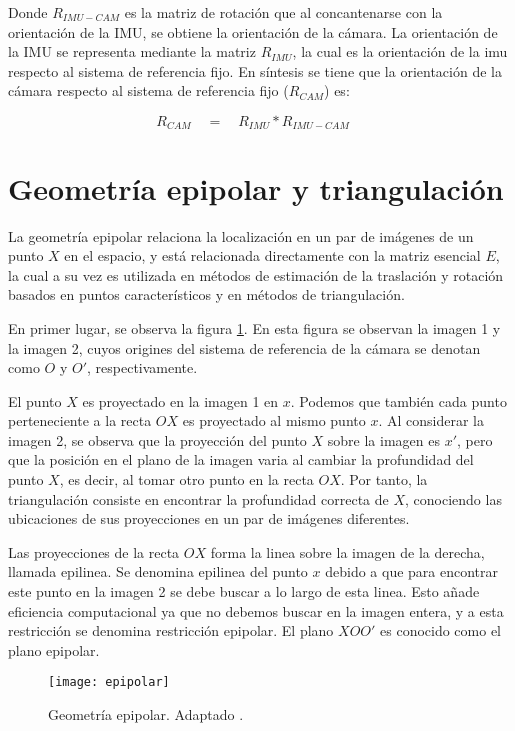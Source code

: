 Donde ${R}_{IMU-CAM}$ es la matriz de rotación que al concantenarse con la orientación de la IMU, se obtiene la orientación de la cámara. La orientación de la IMU se representa mediante la matriz ${R}_{IMU}$, la cual es la orientación de la imu respecto al sistema de referencia fijo. En síntesis se tiene que la orientación de la cámara respecto al sistema de referencia fijo (${R}_{CAM}$) es:

\begin{equation}
{ R }_{ CAM }\quad =\quad { R }_{ IMU }*{ R }_{ IMU-CAM }\quad 
\label{eq:rotacionIMUCAM} 
\end{equation}


\section{Geometría epipolar y triangulación}

La geometría epipolar relaciona la localización en un par de imágenes de un punto $X$ en el espacio, y está relacionada directamente con la matriz esencial $E$, la cual a su vez es utilizada en métodos de estimación de la traslación y rotación basados en puntos característicos y en métodos de triangulación.

En primer lugar, se observa la figura \ref{imagen:epipolar}. En esta figura se observan la imagen 1 y la imagen 2, cuyos origines del sistema de referencia de la cámara se denotan como $O$ y $O'$, respectivamente.

El punto $X$ es proyectado en la imagen 1 en $x$. Podemos que también cada punto perteneciente a la recta $OX$ es proyectado al mismo punto $x$. Al considerar la imagen 2, se observa que la proyección del punto $X$ sobre la imagen es $x'$, pero que la posición en el plano de la imagen varia al cambiar la profundidad del punto $X$, es decir, al tomar otro punto en la recta $OX$.  Por tanto, la triangulación consiste en encontrar la profundidad correcta de $X$, conociendo las ubicaciones de sus proyecciones en un par de imágenes diferentes.

Las proyecciones de la recta $OX$ forma la linea sobre la imagen de la derecha, llamada epilinea. Se denomina epilinea del punto $x$ debido a que para encontrar este punto en la imagen 2 se debe buscar a lo largo de esta linea. Esto añade eficiencia computacional ya que no debemos buscar en la imagen entera, y a esta restricción se denomina restricción epipolar. El plano $XOO'$ es conocido como el plano epipolar.

\begin{figure}[H]
	\centering
	\texttt{[image: epipolar]}
	\caption[Geometría epipolar]{Geometría epipolar. Adaptado \protect\footnotemark.}
	\label{imagen:epipolar}
\end{figure}

